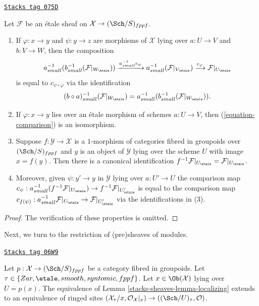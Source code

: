 \begin{lemma}[Comparison]
\label{stacks-sheaves-lemma-comparison}
\href{https://stacks.math.columbia.edu/tag/075D}{\texttt{Stacks tag 075D}}

Let $\mathcal{F}$ be an \'etale sheaf on $\mathcal{X} \to (\Sch/S)_{fppf}$.
\begin{enumerate}
\item If $\varphi : x \to y$ and $\psi : y \to z$
are morphisms of $\mathcal{X}$ lying over $a : U \to V$ and
$b : V \to W$, then the composition
$$
a_{small}^{-1}(b_{small}^{-1} (\mathcal{F}|_{W_\etale}))
\xrightarrow{a_{small}^{-1}c_\psi}
a_{small}^{-1}(\mathcal{F}|_{V_\etale})
\xrightarrow{c_\varphi}
\mathcal{F}|_{U_\etale}
$$
is equal to $c_{\psi \circ \varphi}$ via the identification
$$
(b \circ a)_{small}^{-1}(\mathcal{F}|_{W_\etale}) =
a_{small}^{-1}(b_{small}^{-1} (\mathcal{F}|_{W_\etale})).
$$
\item If $\varphi : x \to y$ lies over an \'etale morphism of schemes
$a : U \to V$, then (\ref{equation-comparison}) is an isomorphism.
\item Suppose $f : \mathcal{Y} \to \mathcal{X}$ is a $1$-morphism of
categories fibred in groupoids over $(\Sch/S)_{fppf}$ and $y$ is
an object of $\mathcal{Y}$ lying over the scheme $U$ with image
$x = f(y)$. Then there is a canonical identification
$f^{-1}\mathcal{F}|_{U_\etale} = \mathcal{F}|_{U_\etale}$.
\item Moreover, given $\psi : y' \to y$ in $\mathcal{Y}$ lying over
$a : U' \to U$ the comparison map
$c_\psi : a_{small}^{-1}(f^{-1}\mathcal{F}|_{U_\etale}) \to
f^{-1}\mathcal{F}|_{U'_\etale}$ is equal to the
comparison map $c_{f(\psi)} : a_{small}^{-1}\mathcal{F}|_{U_\etale}
\to \mathcal{F}|_{U'_\etale}$ via the identifications in (3).
\end{enumerate}
\end{lemma}

\begin{proof}
The verification of these properties is omitted.
\end{proof}

Next, we turn to the restriction of (pre)sheaves of modules.

\begin{lemma}
\label{stacks-sheaves-lemma-localizing-structure-sheaf}
\href{https://stacks.math.columbia.edu/tag/06W9}{\texttt{Stacks tag 06W9}}

Let $p : \mathcal{X} \to (\Sch/S)_{fppf}$ be a category fibred
in groupoids. Let $\tau \in \{Zar, \etale, smooth, syntomic, fppf\}$.
Let $x \in \Ob(\mathcal{X})$ lying over $U = p(x)$.
The equivalence of
Lemma \ref{stacks-sheaves-lemma-localizing}
extends to an equivalence of ringed sites
$(\mathcal{X}_\tau/x, \mathcal{O}_\mathcal{X}|_x) \to
((\Sch/U)_\tau, \mathcal{O})$.
\end{lemma}


